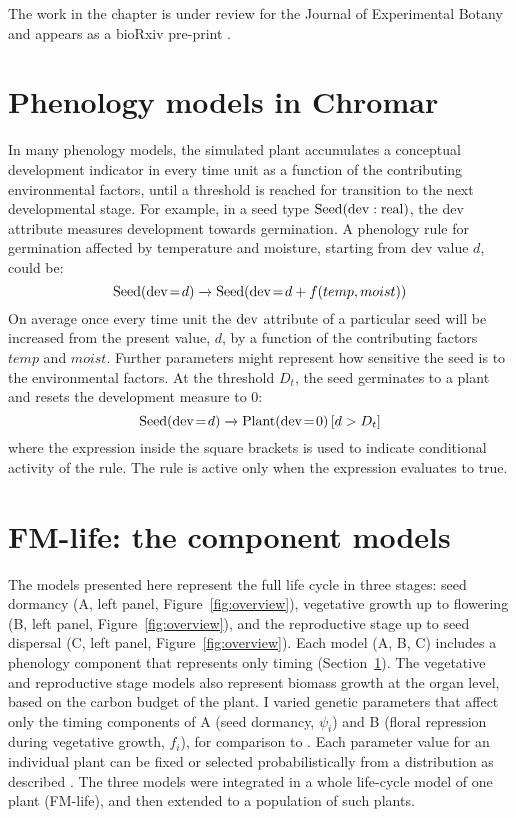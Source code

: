 The work in the chapter is under review for the Journal of Experimental Botany
and appears as a bioRxiv pre-print \citep{zardilis2018multi}.

\section{Phenology models in Chromar}
\label{phenMod}
In many phenology models, the simulated plant accumulates a conceptual
development indicator in every time unit as a function of the
contributing environmental factors, until a threshold is reached for
transition to the next developmental stage. For example, in a seed type
\(\mathrm{Seed}(\mathrm{dev}:\mathrm{real})\), the dev attribute measures
development towards germination. A phenology rule for germination
affected by temperature and moisture, starting from dev value $d$,
could be:
\[\mathrm{Seed}(\mathrm{dev} \! = \! {d}) \xrightarrow{} \mathrm{Seed}(\mathrm{dev} \! = \! {d + f(temp,moist)}) \]
On average once every time unit the $\mathrm{dev}$ attribute of a
particular seed will be increased from the present value, \(d\), by a
function of the contributing factors $temp$ and
$moist$. Further parameters might represent how sensitive the
seed is to the environmental factors. At the threshold
$D_t$, the seed germinates to a plant and resets the
development measure to 0:
%
\[\mathrm{Seed}(\mathrm{dev} \! = \! {d}) \xrightarrow{} \mathrm{Plant}(\mathrm{dev} \! = \! {0}) \, \lbrack d > D_{t}\rbrack \]
%
where the expression inside the square brackets is used to indicate
conditional activity of the rule. The rule is active only when the
expression evaluates to true.

\section{FM-life: the component models}
\label{sec:compModels}
The models presented here represent the full life cycle in three stages: seed
dormancy (A, left panel, Figure~\ref{fig:overview}), vegetative growth up to
flowering (B, left panel, Figure~\ref{fig:overview}), and the reproductive stage
up to seed dispersal (C, left panel, Figure~\ref{fig:overview}). Each model (A,
B, C) includes a phenology component that represents only timing
(Section~\ref{phenMod}). The vegetative and reproductive
stage models also represent biomass growth at the organ level, based on the
carbon budget of the plant. I varied genetic parameters that affect only the
timing components of A (seed dormancy, \(\psi_{i}\)) and B (floral repression
during vegetative growth, \(f_{i}\)), for comparison to
\citet{burghardt_modeling_2015}.  Each parameter value for an individual plant
can be fixed or selected probabilistically from a distribution as described
\citep{burghardt_modeling_2015}. The three models were integrated in a whole
life-cycle model of one plant (FM-life), and then extended to a population of
such plants.

